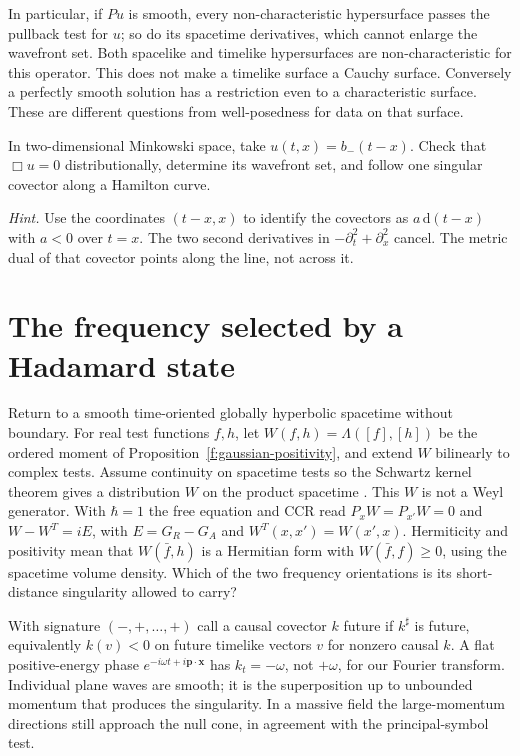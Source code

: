 In particular, if $Pu$ is smooth, every non-characteristic hypersurface
passes the pullback test for $u$; so do its spacetime derivatives, which
cannot enlarge the wavefront set. Both spacelike and timelike
hypersurfaces are non-characteristic for this operator. This does not
make a timelike surface a Cauchy surface. Conversely a perfectly smooth
solution has a restriction even to a characteristic surface. These are
different questions from well-posedness for data on that surface.

\begin{exercise}
In two-dimensional Minkowski space, take $u(t,x)=b_-(t-x)$. Check that
$\Box u=0$ distributionally, determine its wavefront set, and follow one
singular covector along a Hamilton curve.
\end{exercise}
\noindent\emph{Hint.} Use the coordinates $(t-x,x)$ to identify the
covectors as $a\,\mathrm{d}(t-x)$ with $a<0$ over $t=x$. The two second
derivatives in $-\partial_t^2+\partial_x^2$ cancel. The metric dual of
that covector points along the line, not across it.

\section{The frequency selected by a Hadamard state}
Return to a smooth time-oriented globally hyperbolic spacetime without
boundary. For real test functions $f,h$, let $W(f,h)=\Lambda([f],[h])$
be the ordered moment of Proposition~\ref{f:gaussian-positivity}, and
extend $W$ bilinearly to complex tests. Assume continuity on spacetime
tests so the Schwartz kernel theorem gives a distribution $W$ on the
product spacetime \cite{HormI}. This $W$ is not a Weyl generator.
With $\hbar=1$ the free equation and CCR read
$P_x W=P_{x'} W=0$ and $W-W^T=iE$, with $E=G_R-G_A$ and
$W^T(x,x')=W(x',x)$. Hermiticity and positivity mean that $W(\bar f,h)$
is a Hermitian form with $W(\bar f,f)\ge0$, using the spacetime volume
density. Which of the two frequency
orientations is its short-distance singularity allowed to carry?

With signature $(-,+,\ldots,+)$ call a causal covector $k$ future if
$k^\sharp$ is future, equivalently $k(v)<0$ on future timelike vectors
$v$ for nonzero causal $k$. A flat positive-energy phase
$e^{-i\omega t+i\mathbf p\cdot\mathbf x}$ has $k_t=-\omega$, not
$+\omega$, for our Fourier transform. Individual plane waves are smooth;
it is the superposition up to unbounded momentum that produces the
singularity. In a massive field the large-momentum directions still
approach the null cone, in agreement with the principal-symbol test.

